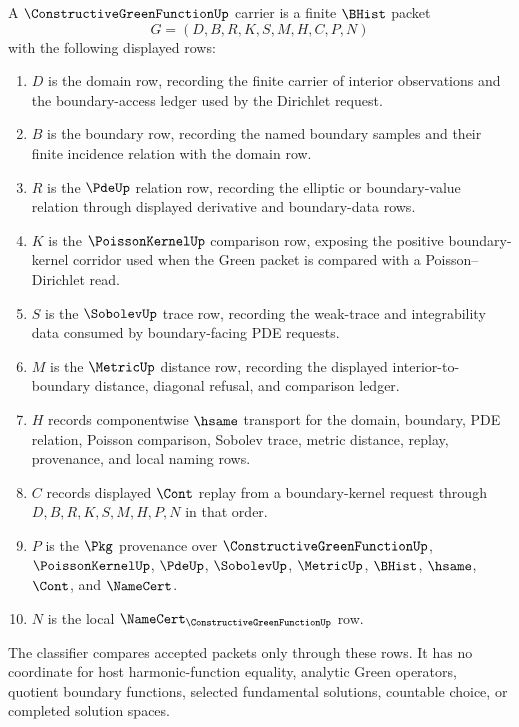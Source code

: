 \begin{definition}
\label{def:constructive-green-function-carrier}
A $\ConstructiveGreenFunctionUp$ carrier is a finite $\BHist$ packet
$$
G=(D,B,R,K,S,M,H,C,P,N)
$$
with the following displayed rows:
\begin{enumerate}
\item $D$ is the domain row, recording the finite carrier of interior observations and the boundary-access ledger used by the Dirichlet request.
\item $B$ is the boundary row, recording the named boundary samples and their finite incidence relation with the domain row.
\item $R$ is the $\PdeUp$ relation row, recording the elliptic or boundary-value relation through displayed derivative and boundary-data rows.
\item $K$ is the $\PoissonKernelUp$ comparison row, exposing the positive boundary-kernel corridor used when the Green packet is compared with a Poisson--Dirichlet read.
\item $S$ is the $\SobolevUp$ trace row, recording the weak-trace and integrability data consumed by boundary-facing PDE requests.
\item $M$ is the $\MetricUp$ distance row, recording the displayed interior-to-boundary distance, diagonal refusal, and comparison ledger.
\item $H$ records componentwise $\hsame$ transport for the domain, boundary, PDE relation, Poisson comparison, Sobolev trace, metric distance, replay, provenance, and local naming rows.
\item $C$ records displayed $\Cont$ replay from a boundary-kernel request through $D,B,R,K,S,M,H,P,N$ in that order.
\item $P$ is the $\Pkg$ provenance over $\ConstructiveGreenFunctionUp$, $\PoissonKernelUp$, $\PdeUp$, $\SobolevUp$, $\MetricUp$, $\BHist$, $\hsame$, $\Cont$, and $\NameCert$.
\item $N$ is the local $\NameCert_{\ConstructiveGreenFunctionUp}$ row.
\end{enumerate}
The classifier compares accepted packets only through these rows. It has no coordinate for host harmonic-function equality, analytic Green operators, quotient boundary functions, selected fundamental solutions, countable choice, or completed solution spaces.
\end{definition}

